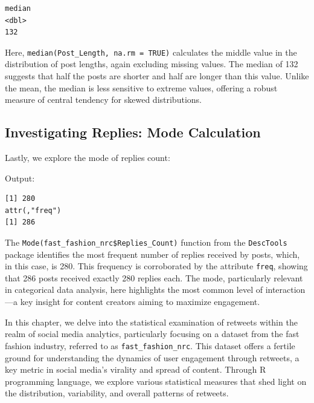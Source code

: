 \documentclass[
]{book}
\newenvironment{Shaded}{\begin{snugshade}}{\end{snugshade}}
\newcommand{\FunctionTok}[1]{\textcolor[rgb]{0.13,0.29,0.53}{\textbf{#1}}}
\newcommand{\NormalTok}[1]{#1}
\newcommand{\OtherTok}[1]{\textcolor[rgb]{0.56,0.35,0.01}{#1}}
\newcommand{\SpecialCharTok}[1]{\textcolor[rgb]{0.81,0.36,0.00}{\textbf{#1}}}
\begin{document}
\begin{verbatim}
median
<dbl>
132
\end{verbatim}

Here, \texttt{median(Post\_Length,\ na.rm\ =\ TRUE)} calculates the middle value in the distribution of post lengths, again excluding missing values. The median of 132 suggests that half the posts are shorter and half are longer than this value. Unlike the mean, the median is less sensitive to extreme values, offering a robust measure of central tendency for skewed distributions.

\hypertarget{investigating-replies-mode-calculation}{%
\subsection{Investigating Replies: Mode Calculation}\label{investigating-replies-mode-calculation}}

Lastly, we explore the mode of replies count:

\begin{Shaded}
\end{Shaded}

Output:

\begin{verbatim}
[1] 280
attr(,"freq")
[1] 286
\end{verbatim}

The \texttt{Mode(fast\_fashion\_nrc\$Replies\_Count)} function from the \texttt{DescTools} package identifies the most frequent number of replies received by posts, which, in this case, is 280. This frequency is corroborated by the attribute \texttt{freq}, showing that 286 posts received exactly 280 replies each. The mode, particularly relevant in categorical data analysis, here highlights the most common level of interaction---a key insight for content creators aiming to maximize engagement.

In this chapter, we delve into the statistical examination of retweets within the realm of social media analytics, particularly focusing on a dataset from the fast fashion industry, referred to as \texttt{fast\_fashion\_nrc}. This dataset offers a fertile ground for understanding the dynamics of user engagement through retweets, a key metric in social media's virality and spread of content. Through R programming language, we explore various statistical measures that shed light on the distribution, variability, and overall patterns of retweets.
\end{document}
